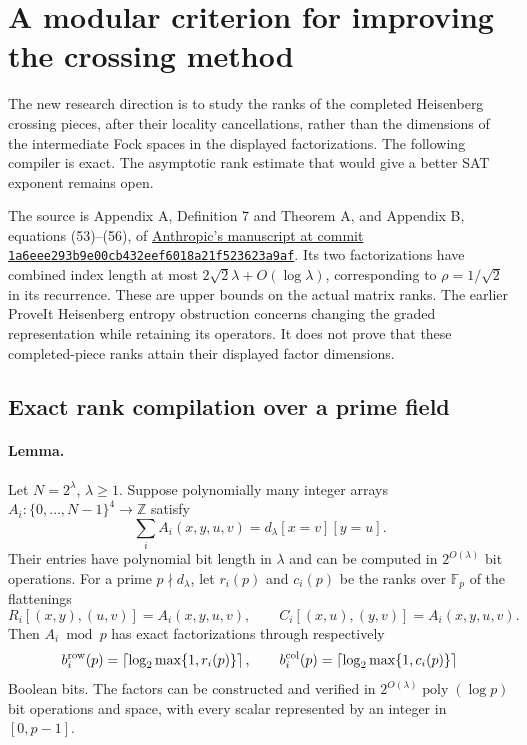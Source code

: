 \section{A modular criterion for improving the crossing method}
\label{sec:modular-rank-criterion}

The new research direction is to study the ranks of the completed
Heisenberg crossing pieces, after their locality cancellations, rather
than the dimensions of the intermediate Fock spaces in the displayed
factorizations. The following compiler is exact. The asymptotic rank
estimate that would give a better SAT exponent remains open.

The source is Appendix A, Definition 7 and Theorem A, and Appendix B,
equations (53)--(56), of
\href{https://github.com/anthropics/formal-math/blob/1a6eee293b9e00cb432eef6018a21f523623a9af/eth/paper.pdf}
{Anthropic's manuscript at commit \texttt{1a6eee293b9e00cb432eef6018a21f523623a9af}}.
Its two factorizations have combined index length at most
$2\sqrt2\lambda+O(\log\lambda)$, corresponding to
$\rho=1/\sqrt2$ in its recurrence. These are upper bounds on the
actual matrix ranks. The earlier ProveIt Heisenberg entropy obstruction
concerns changing the graded representation while retaining its
operators. It does not prove that these completed-piece ranks attain
their displayed factor dimensions.

\subsection{Exact rank compilation over a prime field}

\paragraph{Lemma.}
Let $N=2^\lambda$, $\lambda\ge1$. Suppose polynomially many integer
arrays $A_i:\{0,\ldots,N-1\}^4\to\mathbb Z$ satisfy
\begin{equation}\label{eq:modular-crossing-identity}
 \sum_i A_i(x,y,u,v)=d_\lambda[x=v][y=u].
\end{equation}
Their entries have polynomial bit length in $\lambda$ and can be
computed in $2^{O(\lambda)}$ bit operations. For a prime
$p\nmid d_\lambda$, let $r_i(p)$ and $c_i(p)$ be the ranks over
$\mathbb F_p$ of the flattenings
\[
 R_i[(x,y),(u,v)]=A_i(x,y,u,v),\qquad
 C_i[(x,u),(y,v)]=A_i(x,y,u,v).
\]
Then $A_i\bmod p$ has exact factorizations through respectively
\[
 b_i^{\rm row}(p)=\left\lceil\log_2\max\{1,r_i(p)\}\right\rceil,
 \qquad
 b_i^{\rm col}(p)=\left\lceil\log_2\max\{1,c_i(p)\}\right\rceil
\]
Boolean bits. The factors can be constructed and verified in
$2^{O(\lambda)}\operatorname{poly}(\log p)$ bit operations and space,
with every scalar represented by an integer in $[0,p-1]$.

